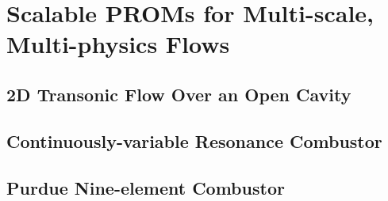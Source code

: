 \chapter{Scalable PROMs for Multi-scale, Multi-physics Flows}
\label{chap:HPROMResults}


\section{2D Transonic Flow Over an Open Cavity}\label{sec:cavity}

\section{Continuously-variable Resonance Combustor}\label{sec:cvrc}

\section{Purdue Nine-element Combustor}\label{sec:nineElem}

